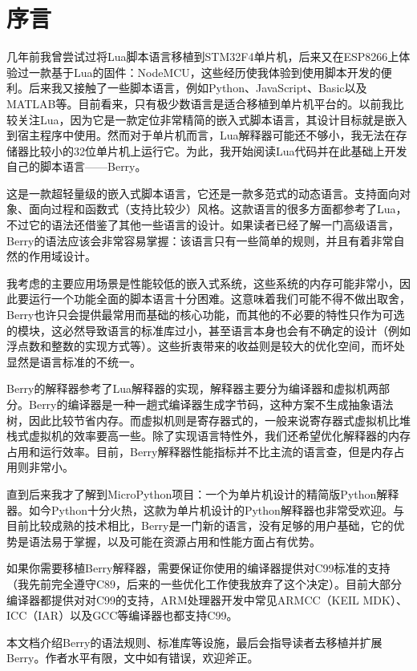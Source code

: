 \chapter*{序\quad 言}

\pagestyle{empty}
\thispagestyle{empty}

几年前我曾尝试过将Lua脚本语言移植到STM32F4单片机，后来又在ESP8266上体验过一款基于Lua的固件：NodeMCU，这些经历使我体验到使用脚本开发的便利。后来我又接触了一些脚本语言，例如Python、JavaScript、Basic以及MATLAB等。目前看来，只有极少数语言是适合移植到单片机平台的。以前我比较关注Lua，因为它是一款定位非常精简的嵌入式脚本语言，其设计目标就是嵌入到宿主程序中使用。然而对于单片机而言，Lua解释器可能还不够小，我无法在存储器比较小的32位单片机上运行它。为此，我开始阅读Lua代码并在此基础上开发自己的脚本语言------Berry。

这是一款超轻量级的嵌入式脚本语言，它还是一款多范式的动态语言。支持面向对象、面向过程和函数式（支持比较少）风格。这款语言的很多方面都参考了Lua，不过它的语法还借鉴了其他一些语言的设计。如果读者已经了解一门高级语言，Berry的语法应该会非常容易掌握：该语言只有一些简单的规则，并且有着非常自然的作用域设计。

我考虑的主要应用场景是性能较低的嵌入式系统，这些系统的内存可能非常小，因此要运行一个功能全面的脚本语言十分困难。这意味着我们可能不得不做出取舍，Berry也许只会提供最常用而基础的核心功能，而其他的不必要的特性只作为可选的模块，这必然导致语言的标准库过小，甚至语言本身也会有不确定的设计（例如浮点数和整数的实现方式等）。这些折衷带来的收益则是较大的优化空间，而坏处显然是语言标准的不统一。

Berry的解释器参考了Lua解释器的实现，解释器主要分为编译器和虚拟机两部分。Berry的编译器是一种一趟式编译器生成字节码，这种方案不生成抽象语法树，因此比较节省内存。而虚拟机则是寄存器式的，一般来说寄存器式虚拟机比堆栈式虚拟机的效率要高一些。除了实现语言特性外，我们还希望优化解释器的内存占用和运行效率。目前，Berry解释器性能指标并不比主流的语言查，但是内存占用则非常小。

直到后来我才了解到MicroPython项目：一个为单片机设计的精简版Python解释器。如今Python十分火热，这款为单片机设计的Python解释器也非常受欢迎。与目前比较成熟的技术相比，Berry是一门新的语言，没有足够的用户基础，它的优势是语法易于掌握，以及可能在资源占用和性能方面占有优势。

如果你需要移植Berry解释器，需要保证你使用的编译器提供对C99标准的支持（我先前完全遵守C89，后来的一些优化工作使我放弃了这个决定）。目前大部分编译器都提供对对C99的支持，ARM处理器开发中常见ARMCC（KEIL MDK）、ICC（IAR）以及GCC等编译器也都支持C99。

本文档介绍Berry的语法规则、标准库等设施，最后会指导读者去移植并扩展Berry。作者水平有限，文中如有错误，欢迎斧正。
